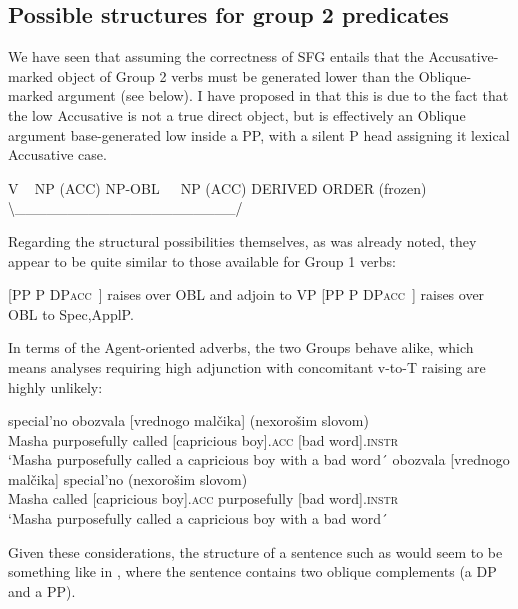 \documentclass[output=paper,colorlinks,citecolor=brown]{./langscibook}
\begin{document}
\subsection{Possible structures for group 2 predicates}\label{sec:antonyuk:4.2}

We have seen that assuming the correctness of SFG entails that the Accusative-marked object of Group 2 verbs must be generated lower than the Oblique-marked argument (see  below). I have proposed in \citet{Antonyuk2015} that this is due to the fact that the low Accusative is not a true direct object, but is effectively an Oblique argument base-generated low inside a PP, with a silent P head assigning it lexical Accusative case. 

\ea%
    \label{ex:antonyuk:49}
    V ~ NP (ACC) NP-OBL~~~NP (ACC)  DERIVED ORDER (frozen)  ~                               {\textbackslash}\_\_\_\_\_\_\_\_\_\_\_\_\_\_\_\_\_\_\_\_\_/
    \z

Regarding the structural possibilities themselves, as was already noted, they appear to be quite similar to those available for Group 1 verbs:


\ea%
    \label{ex:antonyuk:50}
    \ea \label{ex:antonyuk:50a}
    [PP P DP\textsc{acc~}] raises over OBL and adjoin to VP
    \ex \label{ex:antonyuk:50b}
    [PP P DP\textsc{acc~]}\textsubscript{} raises over OBL to Spec,ApplP.
    \z
\z

In terms of the Agent-oriented adverbs, the two Groups behave alike, which means analyses requiring high adjunction with concomitant v-to-T raising are highly unlikely:

\ea%
    \label{ex:antonyuk:51}
    \ea \label{ex:antonyuk:51a}
       {special’no}    {obozvala} {[vrednogo}  {malčika]} {(nexorošim} {slovom)}\\
    Masha purposefully called      [capricious boy].\textsc{acc} [bad word].\textsc{instr}\\
    \glt `Masha purposefully called a capricious boy with a bad word´
    \ex \label{ex:antonyuk:51b}
      {obozvala} {[vrednogo} {malčika]}  {special’no}      {(nexorošim} {slovom)}\\
    Masha called     [capricious boy].\textsc{acc} purposefully  [bad word].\textsc{instr}\\
    \glt `Masha purposefully called a capricious boy with a bad word´
    \z
\z

Given these considerations, the structure of a sentence such as  would seem to be something like in , where the sentence contains two oblique complements (a DP and a PP).
\end{document}
